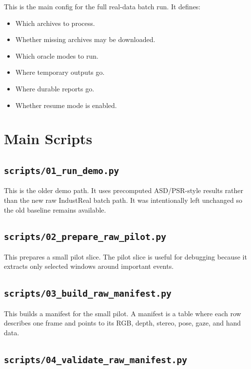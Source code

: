 \documentclass[11pt,a4paper]{article}
\begin{document}
This is the main config for the full real-data batch run. It defines:

\begin{itemize}[leftmargin=*]
    \item Which archives to process.
    \item Whether missing archives may be downloaded.
    \item Which oracle modes to run.
    \item Where temporary outputs go.
    \item Where durable reports go.
    \item Whether resume mode is enabled.
\end{itemize}

\section{Main Scripts}

\subsection{\texttt{scripts/01\_run\_demo.py}}

This is the older demo path. It uses precomputed ASD/PSR-style results rather than the new raw IndustReal batch path. It was intentionally left unchanged so the old baseline remains available.

\subsection{\texttt{scripts/02\_prepare\_raw\_pilot.py}}

This prepares a small pilot slice. The pilot slice is useful for debugging because it extracts only selected windows around important events.

\subsection{\texttt{scripts/03\_build\_raw\_manifest.py}}

This builds a manifest for the small pilot. A manifest is a table where each row describes one frame and points to its RGB, depth, stereo, pose, gaze, and hand data.

\subsection{\texttt{scripts/04\_validate\_raw\_manifest.py}}
\end{document}
